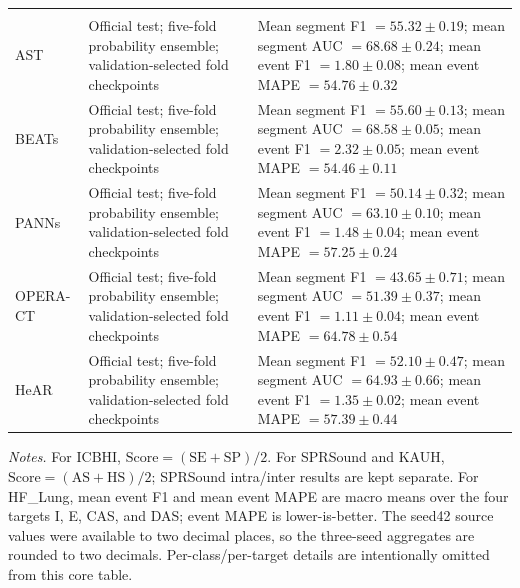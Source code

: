 \documentclass[10pt]{article}
\newcommand{\metric}[2]{\ensuremath{#1\mathbin{\pm}#2}}
\begin{document}
\begin{landscape}
\begin{longtable}{@{}P{2.2cm}P{4.6cm}P{19.4cm}@{}}
\midrule
\pagebreak[4]
\\
\addlinespace[2pt]
AST &
Official test; five-fold probability ensemble; validation-selected fold checkpoints &
Mean segment F1 $=\metric{55.32}{0.19}$; mean segment AUC $=\metric{68.68}{0.24}$;
mean event F1 $=\metric{1.80}{0.08}$; mean event MAPE $=\metric{54.76}{0.32}$\\
BEATs &
Official test; five-fold probability ensemble; validation-selected fold checkpoints &
Mean segment F1 $=\metric{55.60}{0.13}$; mean segment AUC $=\metric{68.58}{0.05}$;
mean event F1 $=\metric{2.32}{0.05}$; mean event MAPE $=\metric{54.46}{0.11}$\\
PANNs &
Official test; five-fold probability ensemble; validation-selected fold checkpoints &
Mean segment F1 $=\metric{50.14}{0.32}$; mean segment AUC $=\metric{63.10}{0.10}$;
mean event F1 $=\metric{1.48}{0.04}$; mean event MAPE $=\metric{57.25}{0.24}$\\
OPERA-CT &
Official test; five-fold probability ensemble; validation-selected fold checkpoints &
Mean segment F1 $=\metric{43.65}{0.71}$; mean segment AUC $=\metric{51.39}{0.37}$;
mean event F1 $=\metric{1.11}{0.04}$; mean event MAPE $=\metric{64.78}{0.54}$\\
HeAR &
Official test; five-fold probability ensemble; validation-selected fold checkpoints &
Mean segment F1 $=\metric{52.10}{0.47}$; mean segment AUC $=\metric{64.93}{0.66}$;
mean event F1 $=\metric{1.35}{0.02}$; mean event MAPE $=\metric{57.39}{0.44}$\\

\end{longtable}

\noindent\footnotesize
\textit{Notes.}
For ICBHI, $\mathrm{Score}=(\mathrm{SE}+\mathrm{SP})/2$.
For SPRSound and KAUH, $\mathrm{Score}=(\mathrm{AS}+\mathrm{HS})/2$;
SPRSound intra/inter results are kept separate.
For HF\_Lung, mean event F1 and mean event MAPE are macro means over
the four targets I, E, CAS, and DAS; event MAPE is lower-is-better.
The seed42 source values were available to two decimal places, so the
three-seed aggregates are rounded to two decimals.
Per-class/per-target details are intentionally omitted from this core table.

\end{landscape}
\end{document}
